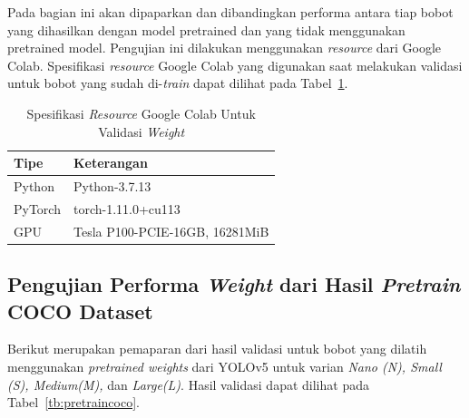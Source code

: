 \par Pada bagian ini akan dipaparkan dan dibandingkan performa antara tiap bobot yang dihasilkan dengan model pretrained dan yang tidak menggunakan pretrained model. Pengujian ini dilakukan menggunakan \emph{resource} dari Google Colab. Spesifikasi \emph{resource} Google Colab yang digunakan saat melakukan validasi untuk bobot yang sudah di-\emph{train} dapat dilihat pada Tabel~\ref{tb:spekgoogleclab}.

\begin{table}
  \centering
  \caption{Spesifikasi \emph{Resource} Google Colab Untuk Validasi \emph{Weight}}
  \label{tb:spekgoogleclab}
  \begin{tabular}{|l|l|} 
  \hline
  Tipe    & Keterangan                      \\ 
  \hline
  Python  & Python-3.7.13                   \\
  PyTorch & torch-1.11.0+cu113              \\
  GPU     & Tesla P100-PCIE-16GB, 16281MiB  \\
  \hline
  \end{tabular}
\end{table}

\subsection{Pengujian Performa \emph{Weight} dari Hasil \emph{Pretrain} COCO Dataset}
\label{subsec:ujiperforma_coco}

\par Berikut merupakan pemaparan dari hasil validasi untuk bobot yang dilatih menggunakan \emph{pretrained weights}
dari YOLOv5 untuk varian \emph{Nano (N), Small (S), Medium(M),} dan \emph{Large(L)}. Hasil validasi dapat dilihat pada
Tabel~\ref{tb:pretraincoco}.


